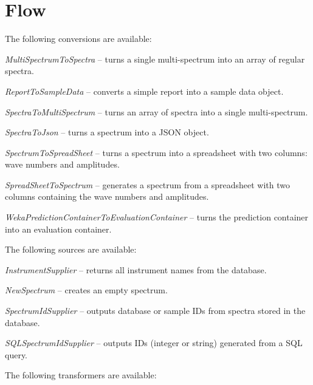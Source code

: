 \documentclass[a4paper]{book}
\begin{document}
\chapter{Flow}
The following conversions are available:
\begin{tight_itemize}
  \item \textit{MultiSpectrumToSpectra} -- turns a single multi-spectrum
  into an array of regular spectra.
  \item \textit{ReportToSampleData} -- converts a simple report into
  a sample data object.
  \item \textit{SpectraToMultiSpectrum} -- turns an array of spectra
  into a single multi-spectrum.
  \item \textit{SpectraToJson} -- turns a spectrum into a JSON object.
  \item \textit{SpectrumToSpreadSheet} -- turns a spectrum into a spreadsheet
  with two columns: wave numbers and amplitudes.
  \item \textit{SpreadSheetToSpectrum} -- generates a spectrum from a spreadsheet
  with two columns containing the wave numbers and amplitudes.
  \item \textit{WekaPredictionContainerToEvaluationContainer} -- turns the
  prediction container into an evaluation container.
\end{tight_itemize}
The following sources are available:
\begin{tight_itemize}
  \item \textit{InstrumentSupplier} -- returns all instrument names from the
  database.
  \item \textit{NewSpectrum} -- creates an empty spectrum.
  \item \textit{SpectrumIdSupplier} -- outputs database or sample IDs from spectra
  stored in the database.
  \item \textit{SQLSpectrumIdSupplier} -- outputs IDs (integer or string)
  generated from a SQL query.
\end{tight_itemize}
The following transformers are available:
\end{document}
